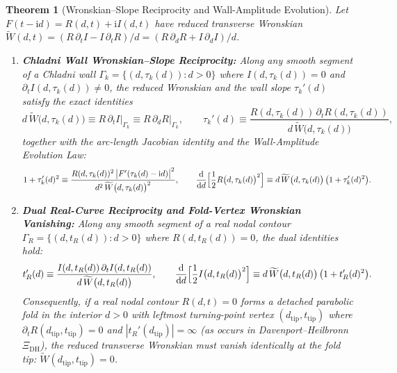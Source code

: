 \documentclass[11pt,reqno]{amsart}
\newtheorem{theorem}{Theorem}[section]
\theoremstyle{definition}
\theoremstyle{remark}
\numberwithin{equation}{section}
\newcommand{\dd}{\mathrm{d}}
\newcommand{\ii}{\mathrm{i}}
\newcommand{\DHf}{\mathrm{DH}}
\begin{document}
\begin{theorem}[Wronskian--Slope Reciprocity and Wall-Amplitude Evolution]\label{thm:wronskian-slope-reciprocity}
Let $F(t-\ii d) = R(d,t) + \ii I(d,t)$ have reduced transverse Wronskian $\widetilde{W}(d,t) = (R\,\partial_t I - I\,\partial_t R)/d = (R\,\partial_d R + I\,\partial_d I)/d$.
\begin{enumerate}[label=\upshape(\alph*),leftmargin=2.2em]
\item \textbf{Chladni Wall Wronskian--Slope Reciprocity:} Along any smooth segment of a Chladni wall $\Gamma_k = \{(d,\tau_k(d)) : d > 0\}$ where $I(d,\tau_k(d))=0$ and $\partial_t I(d,\tau_k(d)) \ne 0$, the reduced Wronskian and the wall slope $\tau_k'(d)$ satisfy the exact identities
\begin{equation}\label{eq:wall-W-identities}
d\,\widetilde{W}\bigl(d,\tau_k(d)\bigr) \equiv R\,\partial_t I\Big|_{\Gamma_k} \equiv R\,\partial_d R\Big|_{\Gamma_k}, \qquad \tau_k'(d) \equiv \frac{R(d,\tau_k(d))\,\partial_t R(d,\tau_k(d))}{d\,\widetilde{W}\bigl(d,\tau_k(d)\bigr)},
\end{equation}
together with the arc-length Jacobian identity and the Wall-Amplitude Evolution Law:
\begin{equation}\label{eq:wall-amplitude-law}
1 + \tau_k'(d)^2 \equiv \frac{R(d,\tau_k(d))^2\,\bigl|F'(\tau_k(d)-\ii d)\bigr|^2}{d^2\,\widetilde{W}\bigl(d,\tau_k(d)\bigr)^2}, \qquad \frac{\dd}{\dd d}\Bigl[\frac{1}{2}R\bigl(d,\tau_k(d)\bigr)^2\Bigr] \equiv d\,\widetilde{W}\bigl(d,\tau_k(d)\bigr)\,\bigl(1 + \tau_k'(d)^2\bigr).
\end{equation}
\item \textbf{Dual Real-Curve Reciprocity and Fold-Vertex Wronskian Vanishing:} Along any smooth segment of a real nodal contour $\Gamma_R = \{(d,t_R(d)) : d > 0\}$ where $R(d,t_R(d))=0$, the dual identities hold:
\begin{equation}\label{eq:dual-real-reciprocity}
t_R'(d) \equiv \frac{I(d,t_R(d))\,\partial_t I(d,t_R(d))}{d\,\widetilde{W}\bigl(d,t_R(d)\bigr)}, \qquad \frac{\dd}{\dd d}\Bigl[\frac{1}{2}I\bigl(d,t_R(d)\bigr)^2\Bigr] \equiv d\,\widetilde{W}\bigl(d,t_R(d)\bigr)\,\bigl(1 + t_R'(d)^2\bigr).
\end{equation}
Consequently, if a real nodal contour $R(d,t)=0$ forms a detached parabolic fold in the interior $d>0$ with leftmost turning-point vertex $(d_{\mathrm{tip}},t_{\mathrm{tip}})$ where $\partial_t R(d_{\mathrm{tip}},t_{\mathrm{tip}})=0$ and $|t_R'(d_{\mathrm{tip}})| = \infty$ (as occurs in Davenport--Heilbronn $\Xi_{\DHf}$), the reduced transverse Wronskian must vanish identically at the fold tip: $\widetilde{W}(d_{\mathrm{tip}},t_{\mathrm{tip}}) = 0$.
\end{enumerate}
\end{theorem}
\end{document}
